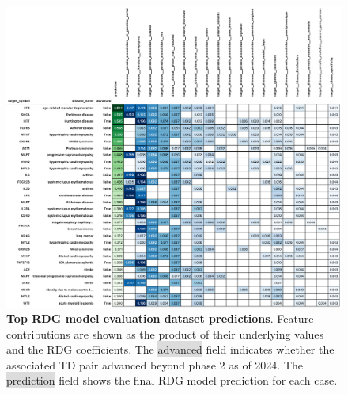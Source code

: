 \documentclass{article}
\begin{document}
\begin{figure}[H]
  \centering
  \captionsetup{width=.9\linewidth}
  \includegraphics[width=1\textwidth]{top_evaluation_predictions.png}
  \caption{
    \textbf{Top RDG model evaluation dataset predictions}.
    Feature contributions are shown as the product of their underlying values and the RDG coefficients. The \colorbox{Gainsboro}{advanced} field indicates whether the associated TD pair advanced beyond phase 2 as of 2024. The \colorbox{Gainsboro}{prediction} field shows the final RDG model prediction for each case.
  }
  \label{fig:top_evaluation_predictions}
\end{figure}

\clearpage
\end{document}
